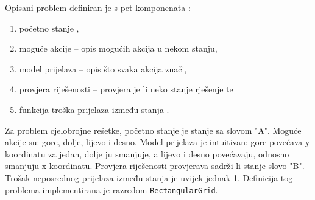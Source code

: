 Opisani problem definiran je s pet komponenata \cite{russelNorvig2003:aima}:

\begin{enumerate}
	\item početno stanje , 
	\item moguće akcije  -- opis mogućih akcija u nekom stanju,
	\item model prijelaza  -- opis što svaka akcija znači, 
	\item provjera riješenosti  -- provjera je li neko stanje rješenje te
	\item funkcija troška prijelaza između stanja .
\end{enumerate}

Za problem cjelobrojne rešetke, početno stanje je stanje sa slovom "A".
Moguće akcije su: gore, dolje, lijevo i desno.
Model prijelaza je intuitivan: gore povećava y koordinatu za jedan, dolje ju smanjuje, a lijevo i desno povećavaju, odnosno smanjuju x koordinatu.
Provjera riješenosti provjerava sadrži li stanje slovo "B".
Trošak neposrednog prijelaza između stanja je uvijek jednak 1.
Definicija tog problema implementirana je razredom \texttt{RectangularGrid}.
